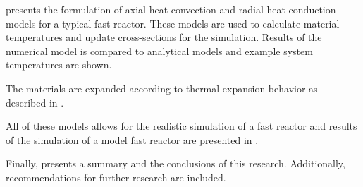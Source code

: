    presents the formulation of axial heat convection
  and radial heat conduction models for a typical fast reactor. These models are 
  used to calculate material temperatures and update cross-sections for the 
  simulation.  Results of the numerical model is compared to analytical models 
  and example system temperatures are shown.

  The materials are expanded according to thermal expansion behavior as
  described in . 
  
  All of these models allows for the realistic simulation of a fast reactor and 
  results of the simulation of a model fast reactor are presented in 
  .
 
  Finally,  presents a 
  summary and the conclusions of this research. Additionally, recommendations 
  for further research are included.

